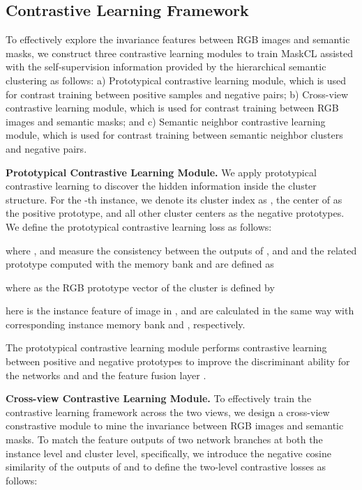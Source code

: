 \documentclass[10pt,twocolumn,letterpaper]{article}
\newcommand{\myparagraph}[1]{\noindent\textbf{#1.}}
\begin{document}
\subsection{Contrastive Learning Framework }
\label{sec:Contrastive-Learning-Framework}

To effectively explore the invariance features between RGB images and semantic masks, we construct three contrastive learning modules to train MaskCL assisted with the self-supervision information provided by the hierarchical semantic clustering as follows:
a) Prototypical contrastive learning module, which is used for contrast training between positive samples and negative pairs;
b) Cross-view contrastive learning module, which is used for contrast training between RGB images and semantic masks; and
c) Semantic neighbor contrastive learning module, which is used for contrast training between semantic neighbor clusters and negative pairs.


\myparagraph{Prototypical Contrastive Learning Module}  We apply prototypical contrastive learning to discover the hidden information inside the cluster structure. For the -th instance, we denote its cluster index as , the center of  as the positive prototype, and all other cluster centers as the negative prototypes. 
We define the prototypical contrastive learning loss as follows:

where ,  and  measure the consistency between the outputs of ,  and  and the related prototype computed with the memory bank and are defined as 

where  as the RGB prototype vector of the cluster  is defined by

here  is the instance feature of image  in ,  and  are calculated in the same way with corresponding instance memory bank  and , respectively. 


The prototypical contrastive learning module performs 
contrastive learning between positive and negative prototypes to improve the discriminant ability for the networks  and  and the feature fusion layer . 




\myparagraph{Cross-view Contrastive Learning Module} To effectively train the contrastive learning framework across the two views, we design a cross-view constrastive module to mine the invariance between RGB images and semantic masks. To match the feature outputs of two network branches at both the instance level and cluster level, specifically, 
we introduce the negative cosine similarity of the outputs of  and  to define the two-level contrastive losses as follows:
\end{document}
